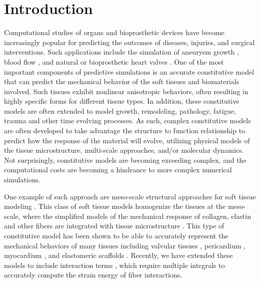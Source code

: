 
\section{Introduction}

	Computational studies of organs and bioprosthetic devices have become increasingly popular for predicting the outcomes of diseases, injuries, and surgical interventions. Such applications include the simulation of aneurysm growth \cite{rissland_abdominal_2009,ramault_comparison_2011,hoi_effects_2004,volokh_model_2008}, blood flow \cite{olufsen_numerical_2000,perktold_computer_1995,pries_blood_1990,oshima_finite_2001,bagchi_mesoscale_2007}, and natural or bioprosthetic heart valves \cite{zakerzadeh_computational_2017, soares_biomechanical_2016, kamensky_immersogeometric_2015, aggarwal_vivo_2016, nobili_numerical_2008, cheng_three_2004}. One of the most important components of predictive simulations is an accurate constitutive model that can predict the mechanical behavior of the soft tissues and biomaterials involved. Such tissues exhibit nonlinear anisotropic behaviors, often resulting in highly specific forms for different tissue types. In addition, these constitutive models are often extended to model growth, remodeling, pathology, fatigue, trauma and other time evolving processes. As such, complex constitutive models are often developed to take advantage the structure to function relationship to predict how the response of the material will evolve, utilizing physical models of the tissue microstructure, multi-scale approaches, and/or molecular dynamics. Not surprisingly, constitutive models are becoming exceeding complex, and the computational costs are becoming a hindrance to more complex numerical simulations. 


	One example of such approach are meso-scale structural approaches for soft tissue modeling \cite{lanir_constitutive_1983}. This class of soft tissue models homogenize the tissues at the meso-scale, where the simplified models of the mechanical response of collagen, elastin and other fibers are integrated with tissue microstructure \cite{kassab_structure_2016}. This type of constitutive model has been shown to be able to accurately represent the mechanical behaviors of many tissues including valvular tissues \cite{zhang_meso_2016, rego_mitral_2016}, pericardium \cite{zhang_modeling_2017}, myocardium \cite{avazmohammadi_novel_2017}, and elastomeric scaffolds \cite{d.amore_large_2016}. Recently,
we have extended these models to include interaction terms \cite{zhang_modeling_2017} \cite{avazmohammadi_novel_2017}, which require multiple integrals to accurately compute the strain energy of fiber interactions. 





